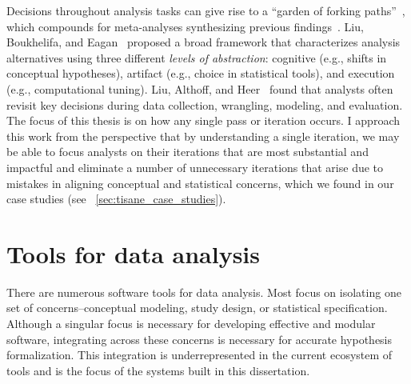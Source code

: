 Decisions throughout analysis tasks can give rise to a ``garden of forking
paths''~\cite{gelman2013garden}, which compounds for meta-analyses synthesizing
previous findings~\cite{kale2019decision}. Liu, Boukhelifa, and
Eagan~\cite{liu2019understanding} proposed a broad framework that characterizes
analysis alternatives using three different \textit{levels of abstraction}:
cognitive (e.g., shifts in conceptual hypotheses), artifact (e.g., choice in
statistical tools), and execution (e.g., computational tuning). Liu, Althoff,
and Heer~\cite{liu2019paths} found that analysts often revisit key decisions
during data collection, wrangling, modeling, and evaluation. The focus of this
thesis is on how any single pass or iteration occurs. I approach this work from
the perspective that by understanding a single iteration, we may be able to
focus analysts on their iterations that are most substantial and impactful and
eliminate a number of unnecessary iterations that arise due to mistakes in
aligning conceptual and statistical concerns, which we found in our case studies
(see ~\autoref{sec:tisane_case_studies}).





\section{Tools for data analysis}


There are numerous software tools for data analysis. Most focus on isolating one
set of concerns--conceptual modeling, study design, or statistical
specification. Although a singular focus is necessary for developing effective
and modular software, integrating across these concerns is necessary for
accurate hypothesis formalization. This integration is underrepresented in the
current ecosystem of tools and is the focus of the systems built in this
dissertation.

